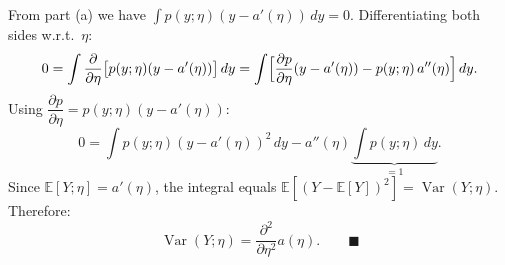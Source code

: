\begin{answer}
From part (a) we have $\int p(y;\eta)(y - a'(\eta))\,dy = 0$. Differentiating both sides w.r.t.\ $\eta$:
\[
0 = \int \frac{\partial}{\partial\eta}\bigl[p(y;\eta)(y-a'(\eta))\bigr]\,dy
  = \int \Bigl[\frac{\partial p}{\partial\eta}(y-a'(\eta)) - p(y;\eta)\,a''(\eta)\Bigr]\,dy.
\]
Using $\dfrac{\partial p}{\partial\eta} = p(y;\eta)(y-a'(\eta))$:
\[
0 = \int p(y;\eta)(y-a'(\eta))^2\,dy - a''(\eta)\underbrace{\int p(y;\eta)\,dy}_{=1}.
\]
Since $\mathbb{E}[Y;\eta] = a'(\eta)$, the integral equals $\mathbb{E}[(Y-\mathbb{E}[Y])^2] = \operatorname{Var}(Y;\eta)$. Therefore:
\[
\operatorname{Var}(Y;\eta) = \frac{\partial^2}{\partial\eta^2}a(\eta). \qquad \blacksquare
\]
\end{answer}
